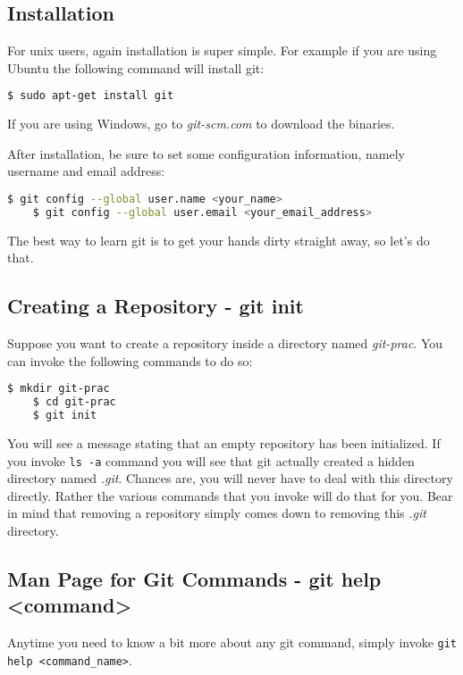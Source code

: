\documentclass{article}
\begin{document}
\subsection{Installation}
For unix users, again installation is super simple. For example if you are using Ubuntu the following command will install git:
\begin{lstlisting}[language=bash]
	$ sudo apt-get install git
\end{lstlisting}
If you are using Windows, go to \textit{git-scm.com} to download the binaries.

After installation, be sure to set some configuration information, namely username and email address:
\begin{lstlisting}[language=bash]
	$ git config --global user.name <your_name>
	$ git config --global user.email <your_email_address>
\end{lstlisting}

The best way to learn git is to get your hands dirty straight away, so let's do that.

\subsection{Creating a Repository - git init}
Suppose you want to create a repository inside a directory named \textit{git-prac}.
You can invoke the following commands to do so:
\begin{lstlisting}[language=bash]
	$ mkdir git-prac
	$ cd git-prac
	$ git init
\end{lstlisting}
You will see a message stating that an empty repository has been initialized.
If you invoke \verb|ls -a| command you will see that git actually created a hidden directory named \textit{.git}.
Chances are, you will never have to deal with this directory directly.
Rather the various commands that you invoke will do that for you.
Bear in mind that removing a repository simply comes down to removing this \textit{.git} directory.

\subsection{Man Page for Git Commands - git help <command>}
Anytime you need to know a bit more about any git command, simply invoke \verb|git help <command_name>|.
\end{document}
